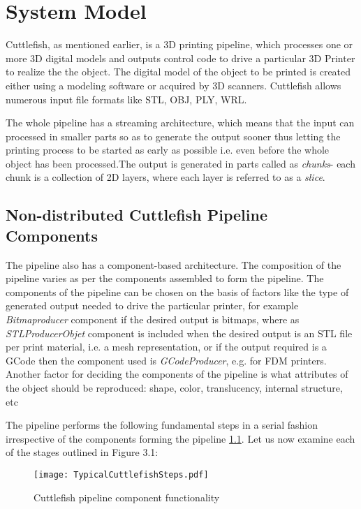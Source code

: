 \chapter{System Model}
Cuttlefish, as mentioned earlier, is a 3D printing pipeline, which processes one or more 3D digital models and outputs control code to drive a particular 3D Printer to realize the the object. The digital model of the object to be printed is created either using a modeling software or acquired by 3D scanners. Cuttlefish allows  numerous input file formats like STL, OBJ, PLY, WRL. 

The whole pipeline has a streaming architecture, which means that the input can processed in smaller parts so as to generate the output sooner thus letting the printing process to be started as early as possible i.e. even before the whole object has been processed.The output is generated in parts called as \textit{chunks}- each chunk is a collection of 2D layers, where each layer is referred to as a \textit{slice}. \newline

\section{Non-distributed Cuttlefish Pipeline Components}

The pipeline also has a component-based architecture. The composition of the pipeline varies as per the components assembled to form the pipeline. The components of the pipeline can be chosen on the basis of factors like the type of generated output needed to drive the particular printer, for example \textit{Bitmaproducer} component if the desired output is bitmaps, where as \textit{STLProducerObjet} component is included when the desired output is an STL file per print material, i.e. a mesh representation, or if the output required is a GCode then the component used is \textit{GCodeProducer}, e.g. for FDM printers. Another factor for deciding the components of the pipeline is what attributes of the object should be reproduced: shape, color, translucency, internal structure, etc
\newline

The pipeline performs the following fundamental steps in a serial fashion irrespective of the components forming the pipeline \ref{fig:TypicalCuttlefishSteps}. Let us now examine each of the stages outlined in Figure 3.1:

\begin{figure}[ht!]
\texttt{[image: TypicalCuttlefishSteps.pdf]}
\caption{Cuttlefish pipeline component functionality}
\label{fig:TypicalCuttlefishSteps}
\end{figure}

